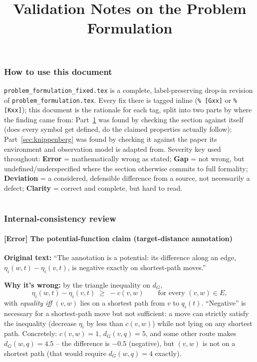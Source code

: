 \documentclass[11pt]{article}
\title{Validation Notes on the Problem Formulation}
\author{}
\date{}
\begin{document}
\maketitle

\tableofcontents

\section*{How to use this document}
\texttt{problem\_formulation\_fixed.tex} is a complete, label-preserving
drop-in revision of \texttt{problem\_formulation.tex}. Every fix there is
tagged inline (\texttt{\% [Gxx]} or \texttt{\% [Kxx]}); this document is the
rationale for each tag, split into two parts by where the finding came from:
Part~\ref{sec:internal} was found by checking the section against itself
(does every symbol get defined, do the claimed properties actually follow);
Part~\ref{sec:knippenberg} was found by checking it against the paper its
environment and observation model is adapted from. Severity key used
throughout: \textbf{Error} = mathematically wrong as stated; \textbf{Gap} =
not wrong, but undefined/underspecified where the section otherwise commits
to full formality; \textbf{Deviation} = a considered, defensible difference
from a source, not necessarily a defect; \textbf{Clarity} = correct and
complete, but hard to read.

\part*{}
\section{Internal-consistency review}
\label{sec:internal}

\subsection*{[Error] The potential-function claim (target-distance annotation)}
\textbf{Original text:} ``The annotation is a potential: its difference along
an edge, $\eta_i(w,t) - \eta_i(v,t)$, is negative exactly on shortest-path
moves.''

\textbf{Why it's wrong:} by the triangle inequality on $d_G$,
\[
  \eta_i(w,t) - \eta_i(v,t) \;\ge\; -c(v,w) \qquad \text{for every } (v,w)\in E,
\]
with \emph{equality iff} $(v,w)$ lies on a shortest path from $v$ to
$q_i(t)$. ``Negative'' is necessary for a shortest-path move but not
sufficient: a move can strictly satisfy the inequality (decrease $\eta_i$ by
less than $c(v,w)$) while not lying on any shortest path. Concretely:
$c(v,w)=1$, $d_G(v,q)=5$, and some other route makes $d_G(w,q)=4.5$ -- the
difference is $-0.5$ (negative), but $(v,w)$ is not on a shortest path (that
would require $d_G(w,q)=4$ exactly).
\end{document}
